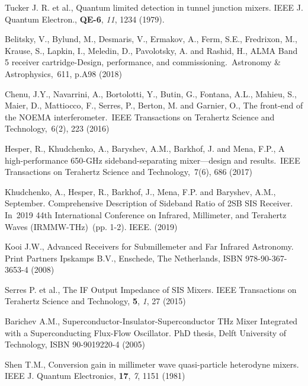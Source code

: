 \documentclass[a4paper]{article}
\begin{document}
\newpage
\begin{thebibliography}{9}

 Tucker J. R. et al., Quantum limited detection in tunnel junction mixers. IEEE J. Quantum Electron., \textbf{QE-6}, \textit{11}, 1234 (1979).

 Belitsky, V., Bylund, M., Desmaris, V., Ermakov, A., Ferm, S.E., Fredrixon, M., Krause, S., Lapkin, I., Meledin, D., Pavolotsky, A. and Rashid, H., ALMA Band 5 receiver cartridge-Design, performance, and commissioning. Astronomy \& Astrophysics, 611, p.A98 (2018)

 Chenu, J.Y., Navarrini, A., Bortolotti, Y., Butin, G., Fontana, A.L., Mahieu, S., Maier, D., Mattiocco, F., Serres, P., Berton, M. and Garnier, O., The front-end of the NOEMA interferometer. IEEE Transactions on Terahertz Science and Technology, 6(2), 223 (2016)

 Hesper, R., Khudchenko, A., Baryshev, A.M., Barkhof, J. and Mena, F.P., A high-performance 650-GHz sideband-separating mixer—design and results. IEEE Transactions on Terahertz Science and Technology, 7(6), 686 (2017)

 Khudchenko, A., Hesper, R., Barkhof, J., Mena, F.P. and Baryshev, A.M., September. Comprehensive Description of Sideband Ratio of 2SB SIS Receiver. In 2019 44th International Conference on Infrared, Millimeter, and Terahertz Waves (IRMMW-THz) (pp. 1-2). IEEE.  (2019)

 Kooi J.W., Advanced Receivers for Submillemeter and Far Infrared Astronomy. Print Partners Ipskamps B.V., Enschede, The Netherlands, ISBN 978-90-367-3653-4 (2008)

 Serres P. et al., The IF Output Impedance of SIS Mixers. IEEE Transactions on Terahertz Science and Technology, \textbf{5}, \textit{1}, 27 (2015)

 Barichev A.M., Superconductor-Insulator-Superconductor THz Mixer Integrated with a Superconducting Flux-Flow Oscillator. PhD thesis, Delft University of Technology, ISBN 90-9019220-4 (2005)

 Shen T.M., Conversion gain in millimeter wave quasi-particle heterodyne mixers. IEEE J. Quantum Electronics, \textbf{17},  \textit{7}, 1151 (1981)

\end{thebibliography}
\end{document}
